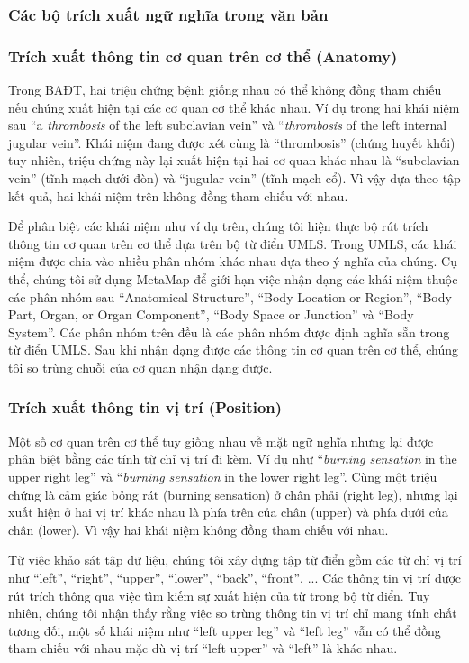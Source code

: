 \subsubsection*{Các bộ trích xuất ngữ nghĩa trong văn bản}

\subsubsection*{Trích xuất thông tin cơ quan trên cơ thể (Anatomy)}
Trong BAĐT, hai triệu chứng bệnh giống nhau có thể không đồng tham chiếu nếu chúng xuất hiện tại các cơ quan cơ thể khác nhau. Ví dụ trong hai khái niệm sau ``a \textit{thrombosis} of the left subclavian vein'' và ``\textit{thrombosis} of the left internal jugular vein''. Khái niệm đang được xét cùng là ``thrombosis'' (chứng huyết khối) tuy nhiên, triệu chứng này lại xuất hiện tại hai cơ quan khác nhau là ``subclavian vein'' (tĩnh mạch dưới đòn) và ``jugular vein'' (tĩnh mạch cổ). Vì vậy dựa theo tập kết quả, hai khái niệm trên không đồng tham chiếu với nhau.

Để phân biệt các khái niệm như ví dụ trên, chúng tôi hiện thực bộ rút trích thông tin cơ quan trên cơ thể dựa trên bộ từ điển UMLS. Trong UMLS, các khái niệm được chia vào nhiều phân nhóm khác nhau dựa theo ý nghĩa của chúng. Cụ thể, chúng tôi sử dụng MetaMap để giới hạn việc nhận dạng các khái niệm thuộc các phân nhóm sau ``Anatomical Structure'', ``Body Location or Region'', ``Body Part, Organ, or Organ Component'', ``Body Space or Junction'' và ``Body System''. Các phân nhóm trên đều là các phân nhóm được định nghĩa sẵn trong từ điển UMLS. Sau khi nhận dạng được các thông tin cơ quan trên cơ thể, chúng tôi so trùng chuỗi của cơ quan nhận dạng được.

\subsubsection*{Trích xuất thông tin vị trí (Position)}
Một số cơ quan trên cơ thể tuy giống nhau về mặt ngữ nghĩa nhưng lại được phân biệt bằng các tính từ chỉ vị trí đi kèm. Ví dụ như ``\textit{burning sensation} in the \underline{upper right leg}'' và ``\textit{burning sensation} in the \underline{lower right leg}''. Cùng một triệu chứng là cảm giác bỏng rát (burning sensation) ở chân phải (right leg), nhưng lại xuất hiện ở hai vị trí khác nhau là phía trên của chân (upper) và phía dưới của chân (lower). Vì vậy hai khái niệm không đồng tham chiếu với nhau.

Từ việc khảo sát tập dữ liệu, chúng tôi xây dựng tập từ điển gồm các từ chỉ vị trí như ``left'', ``right'', ``upper'', ``lower'', ``back'', ``front'', ... Các thông tin vị trí được rút trích thông qua việc tìm kiếm sự xuất hiện của từ trong bộ từ điển. Tuy nhiên, chúng tôi nhận thấy rằng việc so trùng thông tin vị trí chỉ mang tính chất tương đối, một số khái niệm như ``left upper leg'' và ``left leg'' vẫn có thể đồng tham chiếu với nhau mặc dù vị trí ``left upper'' và ``left'' là khác nhau.

